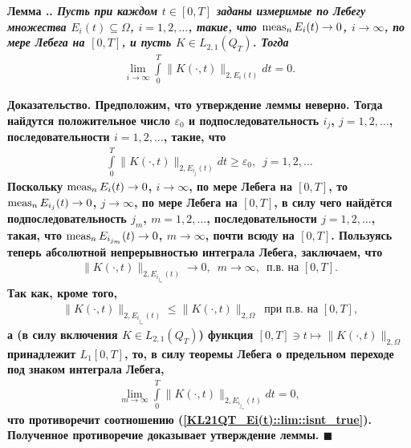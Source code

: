 \documentclass{report}
\newcounter{lem}[section]
\renewcommand{\thelem}{\thesection.\arabic{lem}}
\newenvironment{Lemma}{\par\refstepcounter{lem}\bf Лемма \thelem. \it}{\rm\par}
\newenvironment{Proof}{\par\noindent\bf Доказательство.\rm}{ $\blacksquare$\par}
\newcommand{\meas}{\mathop{\rm meas}\nolimits}
\begin{document}
\begin{Lemma}\label{KL21QT_Ei(t)}
Пусть при каждом $t\in[0,T]$ заданы измеримые по Лебегу множества $E_i(t)\subseteq\Omega$, $i=1,2,\dots$, такие, что $\meas_nE_i(t)\to0$, $i\to\infty$, по мере Лебега на $[0,T]$, и пусть
$K\in L_{2,1}(Q_T)$. Тогда
\begin{gather}\label{KL21QT_Ei(t)::lim}
\lim\limits_{i\to\infty}\int\limits_0^T\|K(\cdot,t)\|_{2,E_i(t)}dt=0.
\end{gather}
\end{Lemma}
\begin{Proof}
Предположим, что утверждение леммы неверно. Тогда найдутся положительное число $\varepsilon_0$ и подпоследовательность $i_j$, $j=1,2,\dots$, последовательности $i=1,2,\dots$, такие, что
\begin{gather}\label{KL21QT_Ei(t)::lim::isnt_true}
\int\limits_0^T\|K(\cdot,t)\|_{2,E_{i_j}(t)}dt\geqslant\varepsilon_0,\,\,\,j=1,2,\dots
\end{gather}
Поскольку $\meas_nE_i(t)\to0$, $i\to\infty$, по мере Лебега на $[0,T]$, то $\meas_nE_{i_j}(t)\to0$, $j\to\infty$, по мере Лебега на $[0,T]$, в силу чего найдётся подпоследовательность
$j_m$, $m=1,2,\dots$, последовательности $j=1,2,\dots$, такая, что $\meas_nE_{i_{j_m}}(t)\to0$, $m\to\infty$, почти всюду на $[0,T]$. Пользуясь теперь абсолютной непрерывностью интеграла
Лебега, заключаем, что
\begin{gather*}
\|K(\cdot,t)\|_{2,E_{i_{j_m}}(t)}\to0,\,\,\,m\to\infty,\,\,\,\text{п.в. на $[0,T]$.}
\end{gather*}
Так как, кроме того,
\begin{gather*}
\|K(\cdot,t)\|_{2,E_{i_{j_m}}(t)}\leqslant\|K(\cdot,t)\|_{2,\Omega}\,\,\,\text{при п.в. на $[0,T]$,}
\end{gather*}
а (в силу включения $K\in L_{2,1}(Q_T)$) функция $[0,T]\ni t\mapsto\|K(\cdot,t)\|_{2,\Omega}$ принадлежит $L_1[0,T]$, то, в силу теоремы Лебега о предельном переходе под знаком интеграла
Лебега,
\begin{gather*}
\lim\limits_{m\to\infty}\int\limits_0^T\|K(\cdot,t)\|_{2,E_{i_{j_m}}(t)}dt=0,
\end{gather*}
что противоречит соотношению (\ref{KL21QT_Ei(t)::lim::isnt_true}). Полученное противоречие доказывает утверждение леммы.
\end{Proof}
\end{document}
